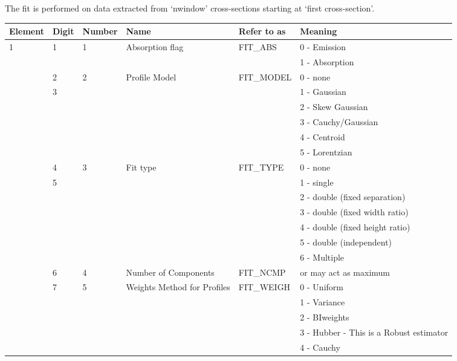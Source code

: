 The fit is performed on data extracted from `nwindow' cross-sections
starting at `first cross-section'.

\begin{latexonly}
\begin{table}
\begin{center}
\tiny
\begin{tabular}{|l|l|l|l|l|l|} \hline
Element & Digit & Number & Name & Refer to as &Meaning\\ \hline
1 & 1 & 1 & Absorption flag & FIT\_ABS & 0 - Emission\\
  &   &   &                 & & 1 - Absorption\\ \cline{2-6}
  & 2 & 2 & Profile Model & FIT\_MODEL & 0 - none\\            
  & 3 &   &               &            & 1 - Gaussian\\        
  &   &   &               &            & 2 - Skew Gaussian\\   
  &   &   &               &            & 3 - Cauchy/Gaussian\\ 
  &   &   &               &            & 4 - Centroid\\
  &   &   &               &            & 5 - Lorentzian\\ \cline{2-6}
  & 4 & 3 & Fit type      & FIT\_TYPE & 0 - none \\
  & 5 &   &               &           & 1 - single \\
  &   &   &               &           & 2 - double (fixed separation) \\
  &   &   &               &          & 3 - double (fixed width ratio) \\
  &   &   &               &         & 4 - double (fixed height ratio) \\
  &   &   &               &           & 5 - double (independent) \\
  &   &   &               &           & 6 - Multiple \\ \cline{2-6}
  & 6 & 4 & Number of Components & FIT\_NCMP & or may act as maximum\\
\cline{2-6}
  & 7 & 5 & Weights Method for Profiles & FIT\_WEIGH & 0 - Uniform\\
  &   &   & & & 1 - Variance\\
  &   &   & & & 2 - BIweights\\
  &   &   & & & 3 - Hubber - This is a Robust estimator\\
  &   &   & & & 4 - Cauchy\\

\end{tabular}
\end{center}
\end{table}
\end{latexonly}
